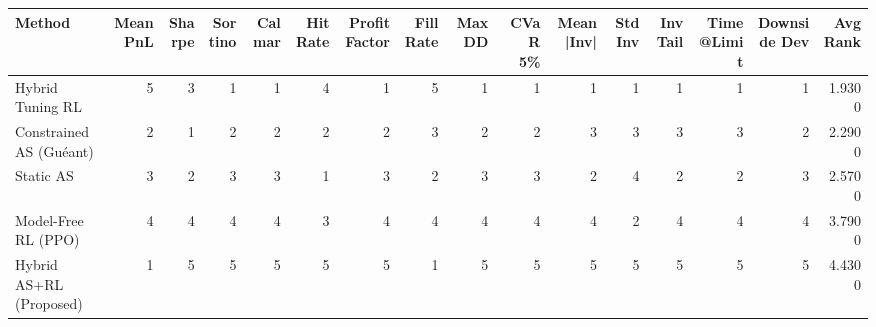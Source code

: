 \begin{tabular}{lrrrrrrrrrrrrrrr}
\toprule
Method & Mean PnL & Sharpe & Sortino & Calmar & Hit Rate & Profit Factor & Fill Rate & Max DD & CVaR 5\% & Mean |Inv| & Std Inv & Inv Tail & Time@Limit & Downside Dev & Avg Rank \\
\midrule
Hybrid Tuning RL & 5 & 3 & 1 & 1 & 4 & 1 & 5 & 1 & 1 & 1 & 1 & 1 & 1 & 1 & 1.9300 \\
Constrained AS (Guéant) & 2 & 1 & 2 & 2 & 2 & 2 & 3 & 2 & 2 & 3 & 3 & 3 & 3 & 2 & 2.2900 \\
Static AS & 3 & 2 & 3 & 3 & 1 & 3 & 2 & 3 & 3 & 2 & 4 & 2 & 2 & 3 & 2.5700 \\
Model-Free RL (PPO) & 4 & 4 & 4 & 4 & 3 & 4 & 4 & 4 & 4 & 4 & 2 & 4 & 4 & 4 & 3.7900 \\
Hybrid AS+RL (Proposed) & 1 & 5 & 5 & 5 & 5 & 5 & 1 & 5 & 5 & 5 & 5 & 5 & 5 & 5 & 4.4300 \\
\bottomrule
\end{tabular}

